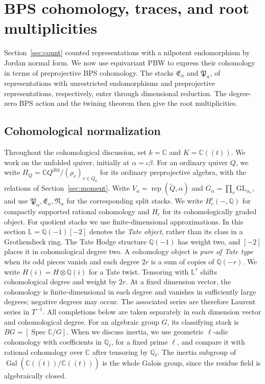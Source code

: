 \documentclass[11pt, reqno]{amsart}
\numberwithin{equation}{section}
\theoremstyle{definition}
\theoremstyle{remark}
\newcommand{\op}[1]{\operatorname{#1}}
\newcommand{\mr}[1]{\mathrm{#1}}
\newcommand{\mb}[1]{\mathbb{#1}}
\newcommand{\Gal}{\op{Gal}}
\newcommand{\Rep}{\op{rep}}
\newcommand{\Qbar}{\widetilde Q}
\begin{document}
\section{BPS cohomology, traces, and root multiplicities}
\label{sec:primitive}\label{sec:allrank-cohomology}
Section~\ref{sec:count} counted representations with a nilpotent
endomorphism by Jordan normal form. We now use equivariant PBW to
express their cohomology in terms of preprojective BPS cohomology.
The stacks $\mathfrak E_\alpha$ and $\mathfrak P_\alpha$, of representations
with unrestricted endomorphisms and preprojective representations,
respectively, enter through dimensional reduction. The degree-zero
BPS action and the twining theorem then give the root multiplicities.

\subsection{Cohomological normalization}
Throughout the cohomological discussion, set $k=\mb C$ and
$K=\mb C((t))$. We work on the unfolded quiver, initially at
$\alpha=\iota\beta$. For an ordinary quiver $Q$, we write
$\Pi_Q=\mb C Q^{\mr{dbl}}/(\rho_v)_{v\in Q_0}$ for its
ordinary preprojective algebra, with the relations of
Section~\ref{sec:moment}.
Write $V_\alpha=\Rep(\Qbar,\alpha)$ and
$G_\alpha=\prod_v\mr{GL}_{\alpha_v}$, and use
$\mathfrak P_\alpha,\mathfrak E_\alpha,\mathfrak N_\alpha$ for the
corresponding split stacks. We write $H_c^i(-,\mb Q)$ for compactly supported rational
cohomology and $H_c$ for its cohomologically graded object. For quotient
stacks we use finite-dimensional approximations. In this section
$\mb L=\mb Q(-1)[-2]$ denotes the \emph{Tate object}, rather
than its class in a Grothendieck ring. The Tate Hodge structure
$\mb Q(-1)$ has weight two, and $[-2]$ places it in cohomological
degree two. A cohomology object is \emph{pure of Tate type} when its
odd pieces vanish and each degree $2r$ is a sum of copies of
$\mb Q(-r)$. We write $H(i)=H\otimes\mb Q(i)$ for a Tate
twist. Tensoring with $\mb L^r$ shifts
cohomological degree and weight by $2r$. At a fixed dimension vector,
the cohomology is finite-dimensional in each degree and vanishes in
sufficiently large degrees; negative degrees may occur. The associated
series are therefore Laurent series in $T^{-1}$. All completions below are taken separately in each dimension vector
and cohomological degree. For an algebraic group $G$, its classifying
stack is $BG=[\op{Spec}\mb C/G]$. When we discuss inertia, we use geometric $\ell$-adic cohomology with
coefficients in $\mb Q_\ell$, for a fixed prime $\ell$, and compare it
with rational cohomology over $\mb C$ after tensoring by
$\mb Q_\ell$. The inertia subgroup of
$\Gal(\overline{\mb C((t))}/\mb C((t)))$ is the whole Galois
group, since the residue field is algebraically closed.
\end{document}
